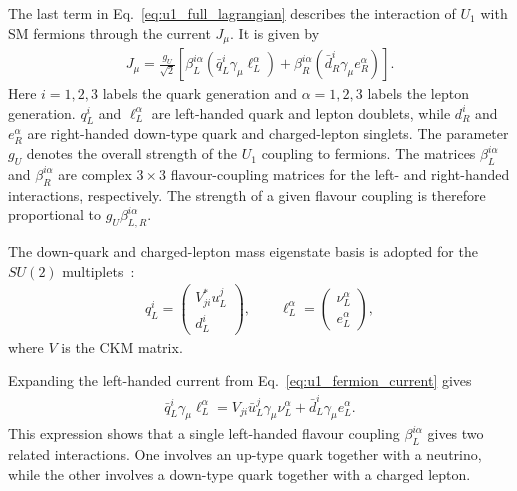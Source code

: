 The last term in Eq.~\eqref{eq:u1_full_lagrangian} describes the interaction of $U_{1}$ with SM fermions through the current $J_{\mu}$. It is given by
\begin{align}
    J_{\mu}
    =
    \frac{g_{U}}{\sqrt{2}}
    \left[
        \beta_{L}^{i\alpha}
        \left(
            \bar{q}_{L}^{i}
            \gamma_{\mu}
            \ell_{L}^{\alpha}
        \right)
        +
        \beta_{R}^{i\alpha}
        \left(
            \bar{d}_{R}^{i}
            \gamma_{\mu}
            e_{R}^{\alpha}
        \right)
    \right].
    \label{eq:u1_fermion_current}
\end{align}
Here $i=1,2,3$ labels the quark generation and $\alpha=1,2,3$ labels the lepton generation. $q_{L}^{i}$ and $\ell_{L}^{\alpha}$ are left-handed quark and lepton doublets, while $d_{R}^{i}$ and $e_{R}^{\alpha}$ are right-handed down-type quark and charged-lepton singlets. 
The parameter $g_{U}$ denotes the overall strength of the $U_{1}$ coupling to fermions. 
The matrices $\beta_{L}^{i\alpha}$ and $\beta_{R}^{i\alpha}$ are complex $3\times3$ flavour-coupling matrices for the left- and right-handed interactions, respectively. 
The strength of a given flavour coupling is therefore proportional to $g_{U}\beta_{L,R}^{i\alpha}$.

The down-quark and charged-lepton mass eigenstate basis is adopted for the $SU(2)$ multiplets~\cite{Cornella2019}:
\begin{align}
    q_{L}^{i}
    =
    \begin{pmatrix}
        V_{ji}^{*}u_{L}^{j}\\
        d_{L}^{i}
    \end{pmatrix},
    \qquad
    \ell_{L}^{\alpha}
    =
    \begin{pmatrix}
        \nu_{L}^{\alpha}\\
        e_{L}^{\alpha}
    \end{pmatrix},
    \label{eq:u1_flavour_basis}
\end{align}
where $V$ is the CKM matrix. 

Expanding the left-handed current from Eq.~\ref{eq:u1_fermion_current} gives
\begin{align}
    \bar{q}_{L}^{i}
    \gamma_{\mu}
    \ell_{L}^{\alpha}
    =
    V_{ji}
    \bar{u}_{L}^{j}
    \gamma_{\mu}
    \nu_{L}^{\alpha}
    +
    \bar{d}_{L}^{i}
    \gamma_{\mu}
    e_{L}^{\alpha}.
    \label{eq:u1_current_expanded}
\end{align}
This expression shows that a single left-handed flavour coupling $\beta_{L}^{i\alpha}$ gives two related interactions. 
One involves an up-type quark together with a neutrino, while the other involves a down-type quark together with a charged lepton.

